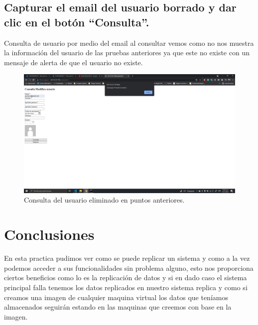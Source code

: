 \documentclass[11pt]{article}
\begin{document}
		\subsection{Capturar el email del usuario borrado y dar clic en el botón ``Consulta''.}
		Consulta de usuario por medio del email al consultar vemos como no nos muestra la información del usuario de las pruebas anteriores ya que este no existe con un mensaje de alerta de que el usuario no existe.
		\begin{figure}[H]
			\centering
			\includegraphics[scale=0.34]{resources/p9.10.png}
			\caption{Consulta del usuario eliminado en puntos anteriores.}\label{fig:picture}
		\end{figure}
		\section{Conclusiones}
	En esta practica pudimos ver como se puede replicar un sistema y como a la vez podemos acceder a sus funcionalidades sin problema alguno, esto nos proporciona ciertos beneficios como lo es la replicación de datos y si en dado caso el sistema principal falla tenemos los datos replicados en nuestro sistema replica y como si creamos una imagen de cualquier maquina virtual los datos que teníamos almacenados seguirán estando en las maquinas que creemos con base en la imagen.
		
\end{document}
